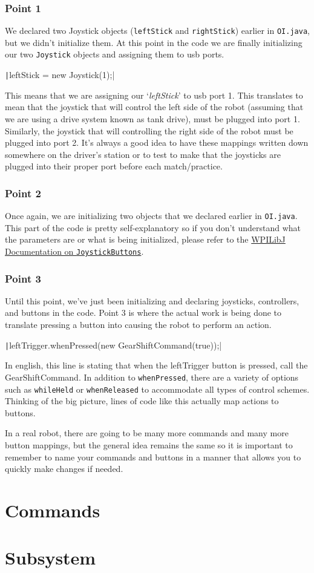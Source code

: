 \documentclass[11pt,fleqn]{article}
\newcommand{\mil}[2][java]{\texttt|#2|}
\begin{document}
\subsubsection{Point 1}
We declared two Joystick objects (\texttt{leftStick} and \texttt{rightStick}) earlier in \texttt{OI.java},
but we didn't initialize them. At this point in the code we are finally initializing our two \texttt{Joystick}
objects and assigning them to usb ports. 

\mil{leftStick = new Joystick(1);}

This means that we are assigning our `\textit{leftStick}' to usb port 1. This translates to mean that
the joystick that will control the left side of the robot (assuming that we are using a drive system known
as tank drive), must be plugged into port 1. Similarly, the joystick that will controlling the right side
of the robot must be plugged into port 2. It's always a good idea to have these mappings written down
somewhere on the driver's station or to test to make that the joysticks are plugged into their proper
port before each match/practice. 

\subsubsection{Point 2}
Once again, we are initializing two objects that we declared earlier in \texttt{OI.java}. This part of
the code is pretty self-explanatory so if you don't understand what the parameters are or what is being
initialized, please refer to the \href{http://first.wpi.edu/FRC/roborio/release/docs/java/}{WPILibJ Documentation
on \texttt{JoystickButtons}}.

\subsubsection{Point 3}
Until this point, we've just been initializing and declaring joysticks, controllers, and buttons in the
code. Point 3 is where the actual work is being done to translate pressing a button into causing the robot
to perform an action. 

\mil{leftTrigger.whenPressed(new GearShiftCommand(true));}

In english, this line is stating that when the leftTrigger button is pressed, call the GearShiftCommand.
In addition to \texttt{whenPressed}, there are a variety of options such as \texttt{whileHeld} or \texttt
{whenReleased} to accommodate all types of control schemes. Thinking of the big picture, lines of code
like this actually map actions to buttons. 

In a real robot, there are going to be many more commands and many more button mappings, but the general
idea remains the same so it is important to remember to name your commands and buttons in a manner that
allows you to quickly make changes if needed. 

\section{Commands}

\section{Subsystem}
\end{document}
